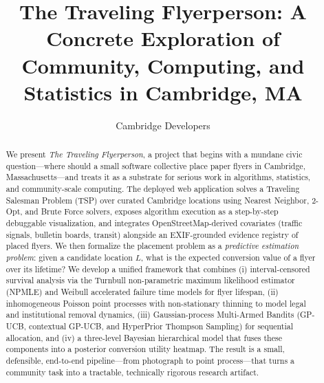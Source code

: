 \documentclass[sigconf,nonacm]{acmart}
\begin{document}
\title{The Traveling Flyerperson: A Concrete Exploration of Community, Computing, and Statistics in Cambridge, MA}

\author{Cambridge Developers}

\renewcommand{\shortauthors}{Cambridge Developers}

\begin{abstract}
We present \emph{The Traveling Flyerperson}, a project that begins with a mundane civic question---where should a small software collective place paper flyers in Cambridge, Massachusetts---and treats it as a substrate for serious work in algorithms, statistics, and community-scale computing. The deployed web application solves a Traveling Salesman Problem (TSP) over curated Cambridge locations using Nearest Neighbor, 2-Opt, and Brute Force solvers, exposes algorithm execution as a step-by-step debuggable visualization, and integrates OpenStreetMap-derived covariates (traffic signals, bulletin boards, transit) alongside an EXIF-grounded evidence registry of placed flyers. We then formalize the placement problem as a \emph{predictive estimation problem}: given a candidate location $L$, what is the expected conversion value of a flyer over its lifetime? We develop a unified framework that combines (i) interval-censored survival analysis via the Turnbull non-parametric maximum likelihood estimator (NPMLE) and Weibull accelerated failure time models for flyer lifespan, (ii) inhomogeneous Poisson point processes with non-stationary thinning to model legal and institutional removal dynamics, (iii) Gaussian-process Multi-Armed Bandits (GP-UCB, contextual GP-UCB, and HyperPrior Thompson Sampling) for sequential allocation, and (iv) a three-level Bayesian hierarchical model that fuses these components into a posterior conversion utility heatmap. The result is a small, defensible, end-to-end pipeline---from photograph to point process---that turns a community task into a tractable, technically rigorous research artifact.
\end{abstract}


\maketitle
\end{document}
